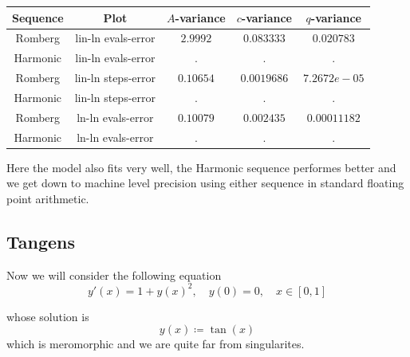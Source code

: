 \begin{table}[H]
    \centering
    \begin{tabular}{c|c||c|c|c}
Sequence & Plot & \(A\)-variance & \(c\)-variance & \(q\)-variance\\\hline
Romberg & lin-ln evals-error & \(2.9992\) & \(0.083333\) & \(0.020783\) \\
Harmonic & lin-ln evals-error & . & . & . \\
Romberg & lin-ln steps-error & \(0.10654\) & \(0.0019686\) & \(7.2672e-05\) \\
Harmonic & lin-ln steps-error & . & . & . \\
Romberg & ln-ln evals-error & \(0.10079\) & \(0.002435\) & \(0.00011182\) \\
Harmonic & ln-ln evals-error & . & . & . \\
    \end{tabular}
    \label{tab:my_label}
\end{table}

Here the model also fits very well, the Harmonic sequence performes better and we get down to machine level precision using either sequence in standard floating point arithmetic.

\subsection{Tangens}

Now we will consider the following equation
\begin{equation}
y'(x) = 1 + y(x)^2, \quad y(0) = 0,\quad x\in [0,1]
\end{equation}

whose solution is 
\[
y(x) \coloneqq \tan(x)
\]
which is meromorphic and we are quite far from singularites.

